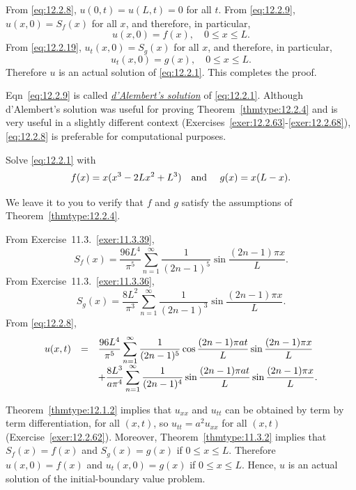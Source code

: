 From \eqref{eq:12.2.8}, $u(0,t)=u(L,t)=0$ for all $t$. From \eqref{eq:12.2.9}, $u(x,0)=S_{f}(x)$ for
all $x$, and therefore, in particular,
\[
  u(x,0)=f(x),\quad0\le x\le L.
\]
From \eqref{eq:12.2.19}, $u_{t}(x,0)=S_{g}(x)$ for all $x$, and therefore, in particular,
\[
  u_{t}(x,0)=g(x),\quad0\le x\le L.
\]
Therefore $u$ is an actual solution of \eqref{eq:12.2.1}. This completes the proof.

Eqn~\eqref{eq:12.2.9} is called
\href{https://mathshistory.st-andrews.ac.uk/Biographies/DAlembert/}{\color{blue}
\it d'Alembert's solution\/} of \eqref{eq:12.2.1}. Although d'Alembert's solution was useful for
proving Theorem~\ref{thmtype:12.2.4} and is very useful in a slightly different context
(Exercises~\ref{exer:12.2.63}-\ref{exer:12.2.68}), \eqref{eq:12.2.8} is preferable for computational
purposes.

\begin{example}
  \label{example:12.2.1} \rm Solve \eqref{eq:12.2.1} with
  \[
    f(x)=x(x^{3}-2Lx^{2}+L^{3}) \mbox{\quad and \quad}g(x)=x(L-x).
  \]
\end{example}

\begin{examplesolution}
\solution We leave it to you to verify that $f$ and $g$ satisfy the assumptions of
Theorem~\ref{thmtype:12.2.4}.

From Exercise~11.3.~\hspace*{-3pt}\ref{exer:11.3.39},
\[
  S_{f}(x)=\frac{96L^{4}}{\pi^{5}}\sum_{n=1}^{\infty}\frac{1}{(2n-1)^{5}}\sin\frac{(2n-1)\pi x}{L}.
\]
From Exercise~11.3.~\hspace*{-3pt}\ref{exer:11.3.36},
\[
  S_{g}(x)=\frac{8L^{2}}{\pi^{3}}\sum_{n=1}^{\infty}\frac{1}{(2n-1)^{3}}\sin\frac{(2n-1)\pi x}{L}.
\]
From \eqref{eq:12.2.8},
\[
  \begin{array}{rcl}
    u(x,t) & = & \displaystyle\frac{96L^{4}}{\pi^{5}}\sum_{n=1}^{\infty}\frac{1}{(2n-1)^{5}} \cos\frac{(2n-1)\pi at}{L}\sin\frac{(2n-1)\pi x}{L}    \\
           &   & + \displaystyle\frac{8L^{3}}{a\pi^{4}}\sum_{n=1}^{\infty}\frac{1}{(2n-1)^{4}} \sin\frac{(2n-1)\pi at}{L}\sin\frac{(2n-1)\pi x}{L}.
  \end{array}
\]

Theorem~\ref{thmtype:12.1.2} implies that $u_{xx}$ and $u_{tt}$ can be obtained by term by term
differentiation, for all $(x,t)$, so $u_{tt}=a^{2}u_{xx}$ for all $(x,t)$
(Exercise~\ref{exer:12.2.62}). Moreover, Theorem~\ref{thmtype:11.3.2} implies that $S_{f}(x)=f(x)$
and $S_{g}(x)=g(x)$ if $0\le x\le L$. Therefore $u(x,0)=f(x)$ and $u_{t}(x,0)=g(x)$ if
$0\le x\le L$. Hence, $u$ is an actual solution of the initial-boundary value problem.
\end{examplesolution}

